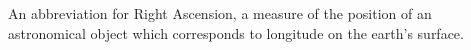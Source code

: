 An abbreviation for Right Ascension, a measure of the position of an
astronomical object which corresponds to longitude on the
earth's surface.